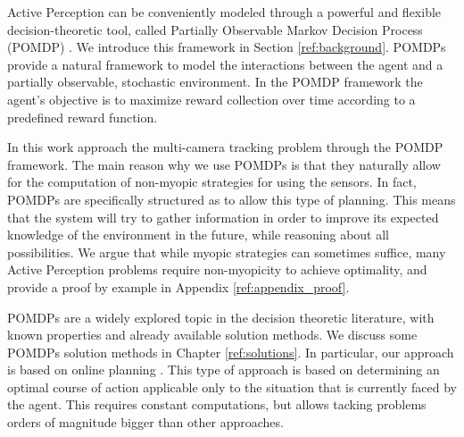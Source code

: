 
Active Perception can be conveniently modeled through a powerful and flexible decision-theoretic
tool, called Partially Observable Markov Decision Process (POMDP) \cite{cit:pomdp}. We introduce
this framework in Section  \ref{ref:background}. POMDPs provide a natural framework to model the
interactions between the agent and a partially observable, stochastic environment.  In the POMDP
framework the agent's objective is to maximize reward collection over time according to a predefined
reward function.

In this work  approach the multi-camera tracking problem through the POMDP framework.  The main
reason why we use POMDPs is that they naturally allow for the computation of non-myopic strategies
for using the sensors. In fact, POMDPs are specifically structured as to allow this type of
planning. This means that the system will try to gather information in order to improve its expected
knowledge of the environment in the future, while reasoning about all possibilities. We argue that
while myopic strategies can sometimes suffice, many Active Perception problems require non-myopicity
to achieve optimality, and provide a proof by example in Appendix \ref{ref:appendix_proof}.

%

POMDPs are a widely explored topic in the decision theoretic literature, with known properties and
already available solution methods. We discuss some POMDPs solution methods in Chapter
\ref{ref:solutions}.
In particular, our approach is based on online planning . This type of approach is based on 
determining an optimal course of action applicable only to the situation that is currently faced by
the agent. This requires constant computations, but allows tacking problems orders of magnitude
bigger than other approaches.




